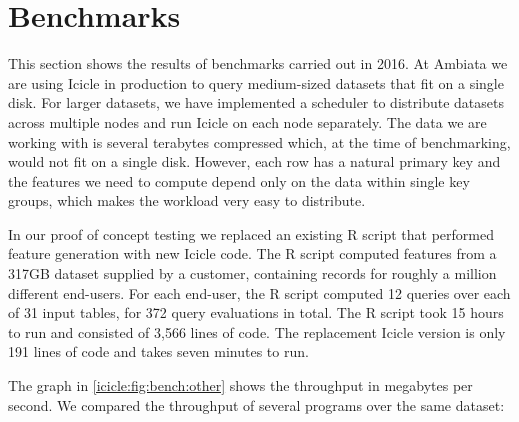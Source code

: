 \section{Benchmarks}
\label{icicle:s:Benchmarks}


This section shows the results of benchmarks carried out in 2016.
At Ambiata we are using Icicle in production to query medium-sized datasets that fit on a single disk.
For larger datasets, we have implemented a scheduler to distribute datasets across multiple nodes and run Icicle on each node separately.
The data we are working with is several terabytes compressed which, at the time of benchmarking, would not fit on a single disk.
However, each row has a natural primary key and the features we need to compute depend only on the data within single key groups, which makes the workload very easy to distribute.


In our proof of concept testing we replaced an existing R script that performed feature generation with new Icicle code.
The R script computed features from a 317GB dataset supplied by a customer, containing records for roughly a million different end-users.
For each end-user, the R script computed 12 queries over each of 31 input tables, for 372 query evaluations in total.
The R script took 15 hours to run and consisted of 3,566 lines of code.
The replacement Icicle version is only 191 lines of code and takes seven minutes to run.

The graph in \cref{icicle:fig:bench:other} shows the throughput in megabytes per second.
We compared the throughput of several programs over the same dataset:

